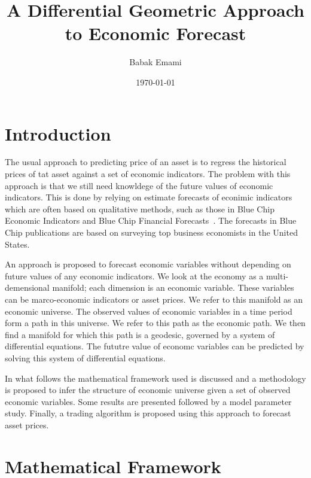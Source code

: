 \documentclass{article}
\title{A Differential Geometric Approach to Economic Forecast}
\author{Babak Emami}
\date{\today}
\begin{document}
\maketitle

\begin{abstract}


\end{abstract}

\section{Introduction}\label{section:introduction}

The usual approach to predicting price of an asset is to regress the
historical prices of tat asset against a set of economic
indicators. The problem with this approach is that we still need
knowldege of the future values of economic indicators. This is done by
relying on estimate forecasts of econimic indicators which are often
based on qualitative methods, such as those in Blue Chip Economic
Indicators and Blue Chip Financial Forecasts~\cite{ref:blue-chip}. The
forecasts in Blue Chip publications are based on surveying top
business economists in the United States.

An approach is proposed to forecast economic variables without
depending on future values of any economic indicators. We look at the
economy as a multi-demensional manifold; each dimension is an economic
variable. These variables can be marco-economic indicators or asset
prices. We refer to this manifold as an economic universe. The
observed values of economic variables in a time period form a path in
this universe. We refer to this path as the economic path. We then
find a manifold for which this path is a geodesic, governed by a
system of differential equations. The fututre value of economc
variables can be predicted by solving this system of differential
equations.

In what follows the mathematical framework used is discussed and a
methodology is proposed to infer the structure of economic universe
given a set of observed economic variables. Some results are presented
followed by a model parameter study. Finally, a trading algorithm is
proposed using this approach to forecast asset prices.

\section{Mathematical Framework}\label{section:mathematical-framework}
\end{document}
